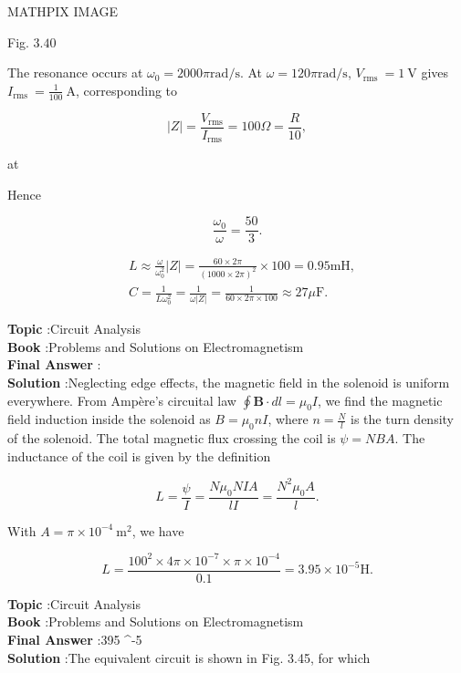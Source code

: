 \documentclass[10pt]{article}
\begin{document}
MATHPIX IMAGE

Fig. $3.40$

The resonance occurs at $\omega_{0}=2000 \pi \mathrm{rad} / \mathrm{s}$. At $\omega=120 \pi \mathrm{rad} / \mathrm{s}$, $V_{\text {rms }}=1 \mathrm{~V}$ gives $I_{\text {rms }}=\frac{1}{100} \mathrm{~A}$, corresponding to

$$
|Z|=\frac{V_{\mathrm{rms}}}{I_{\mathrm{rms}}}=100 \Omega=\frac{R}{10},
$$

at

Hence

$$
\frac{\omega_{0}}{\omega}=\frac{50}{3} .
$$

$$
\begin{aligned}
&L \approx \frac{\omega}{\omega_{0}^{2}}|Z|=\frac{60 \times 2 \pi}{(1000 \times 2 \pi)^{2}} \times 100=0.95 \mathrm{mH}, \\
&C=\frac{1}{L \omega_{0}^{2}}=\frac{1}{\omega|Z|}=\frac{1}{60 \times 2 \pi \times 100} \approx 27 \mu \mathrm{F} .
\end{aligned}
$$

\textbf{Topic} :Circuit Analysis\\
\textbf{Book} :Problems and Solutions on Electromagnetism\\
\textbf{Final Answer} :  \mu {}\\


\textbf{Solution} :Neglecting edge effects, the magnetic field in the solenoid is uniform everywhere. From Ampère's circuital law $\oint \mathbf{B} \cdot d l=\mu_{0} I$, we find the magnetic field induction inside the solenoid as $B=\mu_{0} n I$, where $n=\frac{N}{l}$ is the turn density of the solenoid. The total magnetic flux crossing the coil is $\psi=N B A$. The inductance of the coil is given by the definition

$$
L=\frac{\psi}{I}=\frac{N \mu_{0} N I A}{l I}=\frac{N^{2} \mu_{0} A}{l} .
$$

With $A=\pi \times 10^{-4} \mathrm{~m}^{2}$, we have

$$
L=\frac{100^{2} \times 4 \pi \times 10^{-7} \times \pi \times 10^{-4}}{0.1}=3.95 \times 10^{-5} \mathrm{H} .
$$

\textbf{Topic} :Circuit Analysis\\
\textbf{Book} :Problems and Solutions on Electromagnetism\\
\textbf{Final Answer} :395 ^{-5} \\


\textbf{Solution} :The equivalent circuit is shown in Fig. 3.45, for which
\end{document}
